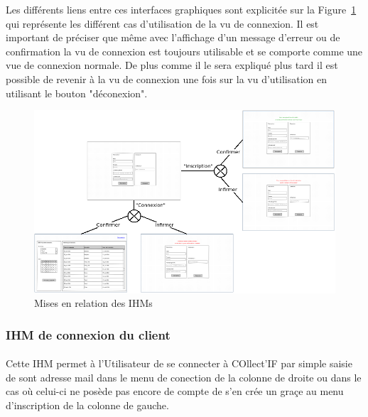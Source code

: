 \documentclass[a4paper,11pt]{article}
\begin{document}
Les différents liens entre ces interfaces graphiques sont explicitée sur la Figure~\ref{IHMs} qui représente les différent cas d'utilisation de la vu de connexion. Il est important de préciser que même avec l'affichage d'un message d'erreur ou de confirmation la vu de connexion est toujours utilisable et se comporte comme une vue de connexion normale. De plus comme il le sera expliqué plus tard il est possible de revenir à la vu de connexion une fois sur la vu d'utilisation en utilisant le bouton "déconexion".

\begin{figure}[H]
  \begin{center}
    \includegraphics[width=15cm]{../../IHM/graphique_IHM.png}
    \caption{Mises en relation des IHMs}
    \label{IHMs}
  \end{center}
\end{figure}
\pagebreak
\subsubsection{IHM de connexion du client}

\paragraph{}
Cette IHM permet à l'Utilisateur de se connecter à COllect'IF par simple saisie de sont adresse mail dans le menu de conection de la colonne de droite ou dans le cas où celui-ci ne posède pas encore de compte de s'en crée un graçe au menu d'inscription de la colonne de gauche.
\end{document}
